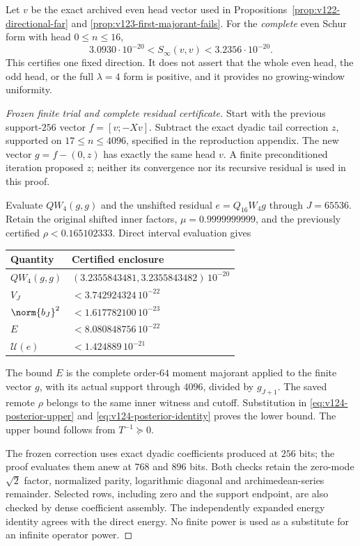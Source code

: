 \begin{proposition}[One complete positive Schur direction at $\lambda=4$]
\label{prop:v124-positive-direction}
Let $v$ be the exact archived even head vector used in
Propositions~\ref{prop:v122-directional-far} and
\ref{prop:v123-first-majorant-fails}. For the \emph{complete}
even Schur form with head $0\le n\le16$,
\begin{equation}\label{eq:v124-positive-direction}
 3.0930\cdot10^{-20}<S_\infty(v,v)<3.2356\cdot10^{-20}.
\end{equation}
This certifies one fixed direction. It does not assert that the
whole even head, the odd head, or the full $\lambda=4$ form is
positive, and it provides no growing-window uniformity.
\end{proposition}
\begin{proof}[Frozen finite trial and complete residual certificate]
Start with the previous support-$256$ vector $f=[v;-Xv]$.
Subtract the exact dyadic tail correction $z$, supported on
$17\le n\le4096$, specified in the reproduction appendix.
The new vector $g=f-(0,z)$ has exactly the same head $v$.
A finite preconditioned iteration proposed $z$; neither its
convergence nor its recursive residual is used in this proof.

Evaluate $QW_4(g,g)$ and the unshifted residual
$e=Q_{16}W_4g$ through $J=65536$. Retain the original shifted
inner factors, $\mu=0.9999999999$, and the previously certified
$\rho<0.165102333$. Direct interval evaluation gives
\begin{center}
\begin{tabular}{@{}ll@{}}
\toprule Quantity & Certified enclosure\\\midrule
$QW_4(g,g)$ & $(3.2355843481,3.2355843482)\,10^{-20}$\\
$V_J$ & $<3.742924324\,10^{-22}$\\
$\norm{b_J}^2$ & $<1.617782100\,10^{-23}$\\
$E$ & $<8.080848756\,10^{-22}$\\
$\mathcal U(e)$ & $<1.424889\,10^{-21}$\\\bottomrule
\end{tabular}
\end{center}
The bound $E$ is the complete order-$64$ moment majorant applied
to the finite vector $g$, with its actual support through $4096$,
divided by $g_{J+1}$. The saved remote $\rho$ belongs to the same
inner witness and cutoff. Substitution in
\eqref{eq:v124-posterior-upper} and
\eqref{eq:v124-posterior-identity} proves the lower bound.
The upper bound follows from $T^{-1}\succeq0$.

The frozen correction uses exact dyadic coefficients produced at
$256$ bits; the proof evaluates them anew at $768$ and $896$
bits. Both checks retain the zero-mode $\sqrt2$ factor, normalized
parity, logarithmic diagonal and archimedean-series remainder.
Selected rows, including zero and the support endpoint, are also
checked by dense coefficient assembly. The independently expanded
energy identity agrees with the direct energy. No finite power is
used as a substitute for an infinite operator power.
\end{proof}


